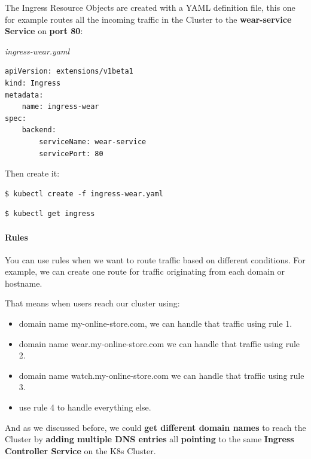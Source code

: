 \documentclass{article}
\newenvironment{codetemplate}[1][]{%
  \mybasecolorbox[#1]
  \itshape
}{%
  \endmybasecolorbox
}
\begin{document}
The Ingress Resource Objects are created with a YAML definition file, this one for example routes all the incoming traffic in the Cluster to the \textbf{wear-service Service} on \textbf{port 80}:

\begin{codetemplate}{ingress-wear.yaml}
\begin{verbatim}
apiVersion: extensions/v1beta1
kind: Ingress
metadata:
    name: ingress-wear
spec:
    backend:
        serviceName: wear-service
        servicePort: 80
\end{verbatim}
\end{codetemplate}

Then create it:

\begin{codetemplate}{}
\begin{verbatim}
$ kubectl create -f ingress-wear.yaml
\end{verbatim}
\end{codetemplate}

\begin{codetemplate}{}
\begin{verbatim}
$ kubectl get ingress
\end{verbatim}
\end{codetemplate}

\paragraph{Rules}

You can use rules when we want to route traffic based on different conditions. For example, we can create one route for traffic originating from each domain or hostname. 

That means when users reach our cluster using:

\begin{itemize}
    \item domain name my-online-store.com, we can handle that traffic using rule 1.
    \item domain name wear.my-online-store.com we can handle that traffic using rule 2.
    \item domain name watch.my-online-store.com we can handle that traffic using rule 3.
    \item use rule 4 to handle everything else.
\end{itemize}

And as we discussed before, we could\textbf{ get different domain names} to reach the Cluster by \textbf{adding multiple DNS entries} all \textbf{pointing} to the same \textbf{Ingress Controller Service} on the K8s Cluster.
\end{document}
